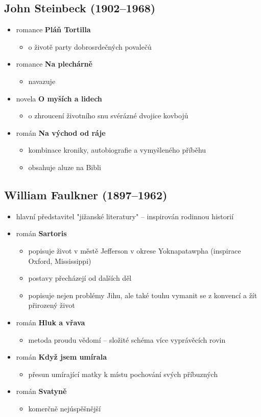 \subsection{John Steinbeck (1902--1968)}
\begin{itemize}
\item romance \textbf{Pláň Tortilla}
	\begin{itemize}
	\item o životě party dobrosrdečných povalečů
	\end{itemize}
\item romance \textbf{Na plechárně}
	\begin{itemize}
	\item navazuje
	\end{itemize}
\item novela \textbf{O myších a lidech}
	\begin{itemize}
	\item o zhroucení životního snu svérázné dvojice kovbojů
	\end{itemize}
\item román \textbf{Na východ od ráje}
	\begin{itemize}
	\item kombinace kroniky, autobiografie a vymyšleného příběhu
	\item obsahuje aluze na Bibli
	\end{itemize}
\end{itemize}

\subsection{William Faulkner (1897--1962)}
\begin{itemize}
\item hlavní představitel "jižanské literatury" -- inspirován rodinnou historií
\item román \textbf{Sartoris}
	\begin{itemize}
	\item popisuje život v městě Jefferson v okrese Yoknapatawpha (inspirace Oxford, Mississippi)
	\item postavy přecházejí od dalších děl
	\item popisuje nejen problémy Jihu, ale také touhu vymanit se z konvencí a žít přirozený život
	\end{itemize}
\item román \textbf{Hluk a vřava}
	\begin{itemize}
	\item metoda proudu vědomí -- složité schéma více vyprávěcích rovin
	\end{itemize}
\item román \textbf{Když jsem umírala}
	\begin{itemize}
	\item přesun umírající matky k místu pochování svých příbuzných
	\end{itemize}
\item román \textbf{Svatyně}
	\begin{itemize}
	\item komerčně nejúspěšnější
	\end{itemize}
\end{itemize}


